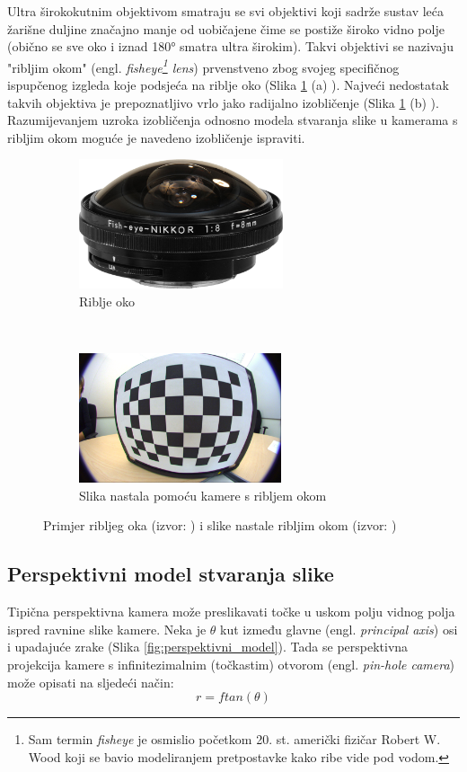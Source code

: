 \documentclass[../seminar.tex]{subfiles}
\begin{document}
Ultra širokokutnim objektivom smatraju se svi objektivi koji sadrže sustav leća žarišne duljine značajno manje od uobičajene čime se postiže široko vidno polje (obično se sve oko i iznad 180° smatra ultra širokim). Takvi objektivi se nazivaju "ribljim okom" (engl. \textit{fisheye\footnote{Sam termin \textit{fisheye} je osmislio početkom 20. st. američki fizičar Robert W. Wood koji se bavio modeliranjem pretpostavke kako ribe vide pod vodom.} lens}) prvenstveno zbog svojeg specifičnog ispupčenog izgleda koje podsjeća na riblje oko (Slika \ref{fig:fisheye_primjeri} (a) ). Najveći nedostatak takvih objektiva je prepoznatljivo vrlo jako radijalno izobličenje (Slika \ref{fig:fisheye_primjeri} (b) ). Razumijevanjem uzroka izobličenja odnosno modela stvaranja slike u kamerama s ribljim okom moguće je navedeno izobličenje ispraviti.

\begin{figure}[ht!]
    \centering
    \begin{subfigure}[t]{0.5\textwidth}
        \centering
        \includegraphics[height=1.5in]{img_001_fisheye_lens_02.png}
        \caption{Riblje oko}
    \end{subfigure}%
    ~ 
    \begin{subfigure}[t]{0.5\textwidth}
        \centering
        \includegraphics[height=1.5in]{img_002_fisheye_image_01.png}
        \caption{Slika nastala pomoću kamere s ribljem okom}
    \end{subfigure}
    \caption{Primjer ribljeg oka (izvor: \cite{KenRockwell:Nikon}) i slike nastale ribljim okom (izvor: \cite{Kashyap})}
    \label{fig:fisheye_primjeri}
\end{figure}

\subsection{Perspektivni model stvaranja slike}
Tipična perspektivna kamera može preslikavati točke u uskom polju vidnog polja ispred ravnine slike kamere. 
Neka je $\theta$ kut između glavne (engl. \textit{principal axis}) osi i upadajuće zrake (Slika \ref{fig:perspektivni_model}).
Tada se perspektivna projekcija kamere s infinitezimalnim (točkastim) otvorom (engl. \textit{pin-hole camera}) može opisati na sljedeći način:
\begin{equation}
r = f tan(\theta)
\end{equation}
\end{document}
